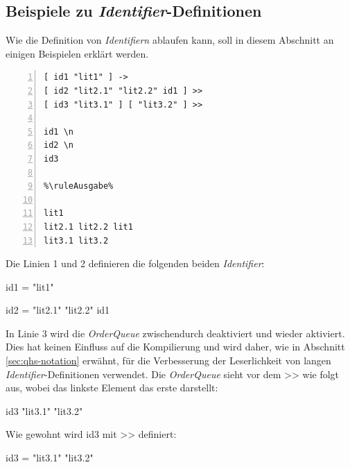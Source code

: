 \subsection{Beispiele zu \textit{Identifier}-Definitionen}
Wie die Definition von \textit{Identifiern} ablaufen kann, soll in diesem Abschnitt an einigen Beispielen erklärt werden.

{
\begin{multicols}{2}
\begin{lstlisting}[language=QHS, label=eg:howto_id1-3, caption=Beispiel zu gewöhnlichen \textit{Identifier}-Definitionen, numbers=left, stepnumber=1]
%\ruleEingabe%
[ id1 "lit1" ] ->
[ id2 "lit2.1" "lit2.2" id1 ] >>
[ id3 "lit3.1" ] [ "lit3.2" ] >>

id1 \n
id2 \n
id3

%\ruleAusgabe%

lit1
lit2.1 lit2.2 lit1
lit3.1 lit3.2
\end{lstlisting}
\columnbreak

Die Linien 1 und 2 definieren die folgenden beiden \textit{Identifier}: \break
\centerline{\selectListingFont id1 = "lit1"{}}
\centerline{\selectListingFont id2 = "lit2.1"{} "lit2.2"{} id1}
In Linie 3 wird die \textit{OrderQueue} zwischendurch deaktiviert und wieder aktiviert.
Dies hat keinen Einfluss auf die Kompilierung und wird daher, wie in Abschnitt \ref{sec:qhs-notation} erwähnt, für die Verbesserung der Leserlichkeit von langen \textit{Identifier}-Definitionen verwendet.
Die \textit{OrderQueue} sieht vor dem {\selectListingFont >>} wie folgt aus, wobei das linkste Element das erste darstellt:  \break
\centerline{\selectListingFont id3 "lit3.1"{} "lit3.2"{}}
Wie gewohnt wird {\selectListingFont id3} mit {\selectListingFont >>} definiert: \break
\centerline{\selectListingFont id3 = "lit3.1"{} "lit3.2"{}}
\end{multicols}
}

